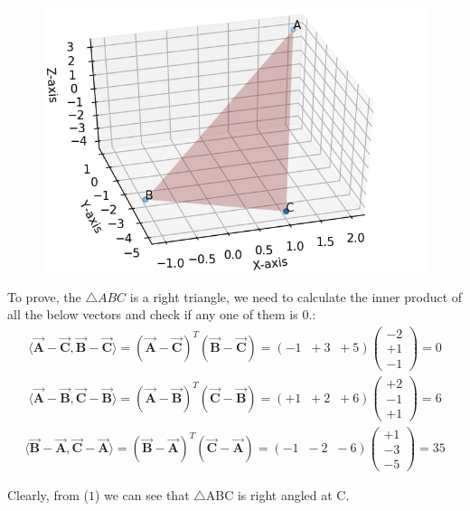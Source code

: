 \documentclass{article}
\newcommand{\vect}[1]{\boldsymbol{\vec{#1}}}
\newcommand{\myvec}[1]{\ensuremath{\begin{pmatrix}#1\end{pmatrix}}}
\begin{document}
\begin{figure}[!htb]
	
	\centering
	
	\includegraphics[width=\columnwidth]{assignment1fig-1.jpg}
	
	\caption{\label{fig1}}
	
	\label{fig:}
	
\end{figure}

To prove, the $\triangle ABC$ is a right triangle, we need to calculate the inner product of all the below vectors and check if any one of them is 0.:
\begin{align}
	\langle \vect{A}-\vect{C}   ,\vect{B}-\vect{C}\rangle = (\vect{A} -\vect{C})^T (\vect{B}-\vect{C}) = (-1\;\; +3 \;\; +5) \myvec{-2 \\ +1 \\ -1}  = 0
\end{align}
\begin{align}
    \langle \vect{A}-\vect{B}   ,\vect{C}-\vect{B}\rangle = (\vect{A} -\vect{B})^T (\vect{C}-\vect{B})
	 = (+1\;\; +2 \;\; +6) \myvec{+2 \\ -1 \\ +1} = 6 
\end{align}
\begin{align}
	\langle \vect{B}-\vect{A}   ,\vect{C}-\vect{A}\rangle = (\vect{B} -\vect{A})^T (\vect{C}-\vect{A}) = (-1\;\; -2 \;\; -6) \myvec{+1\\-3\\-5} = 35 
\end{align}

Clearly, from ($1$) we can see that $\triangle$ABC is right angled at C.
\end{document}
